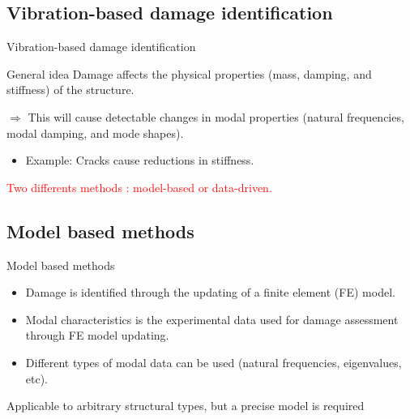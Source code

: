 \documentclass{beamer}
\begin{document}
\subsection{Vibration-based damage identification}
\begin{frame}{Vibration-based damage identification}
\begin{block}{General idea}
	Damage affects the physical properties (mass, damping, and stiffness) of the structure.\newline 
	
	$\Rightarrow$ This will cause detectable changes in modal properties (natural frequencies, modal damping, and mode shapes).
\end{block}
\begin{itemize}
\item Example: Cracks cause reductions in stiffness.
\end{itemize}
\vspace{0.5\baselineskip}
\begin{center}
\textcolor{red}{{\large Two differents methods : model-based or data-driven.}}
\end{center}
\end{frame}

\subsection{Model based methods}
\begin{frame}{Model based methods}
\begin{center}
\begin{itemize}
\item Damage is identified through the updating of a finite element (FE) model.

\vspace{1\baselineskip}
\item Modal characteristics is the experimental data used for damage
assessment through FE model updating.
\vspace{1\baselineskip}
\item Different types of modal data can be used (natural frequencies, eigenvalues, etc).
\end{itemize}
\end{center}

\begin{block}{}
Applicable to arbitrary structural types, but a precise model is required
\end{block}

\end{frame}
\end{document}
